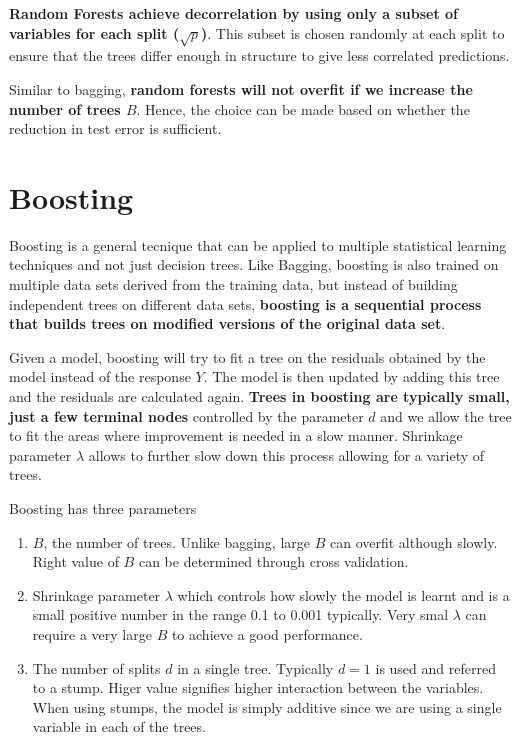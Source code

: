 \documentclass[../statistical_learning_notes.tex]{subfiles}
\begin{document}
    \textbf{Random Forests achieve decorrelation by using only a subset of variables for each split ($\sqrt{p}$)}. This subset is chosen randomly at each split to ensure that the trees differ enough in structure to give less correlated predictions.\newline

    Similar to bagging, \textbf{random forests will not overfit if we increase the number of trees $B$}. Hence, the choice can be made based on whether the reduction in test error is sufficient.
    

    \section{Boosting}
    Boosting is a general tecnique that can be applied to multiple statistical learning techniques and not just decision trees. Like Bagging, boosting is also trained on multiple data sets derived from the training data, but instead of building independent trees on different data sets, \textbf{boosting is a sequential process that builds trees on modified versions of the original data set}.\newline

    Given a model, boosting will try to fit a tree on the residuals obtained by the model instead of the response $Y$. The model is then updated by adding this tree and the residuals are calculated again. \textbf{Trees in boosting are typically small, just a few terminal nodes} controlled by the parameter $d$ and we allow the tree to fit the areas where improvement is needed in a slow manner. Shrinkage parameter $\lambda$ allows to further slow down this process allowing for a variety of trees.\newline

    Boosting has three parameters
    \begin{enumerate}
         \item $B$, the number of trees. Unlike bagging, large $B$ can overfit although slowly. Right value of $B$ can be determined through cross validation.
         \item Shrinkage parameter $\lambda$ which controls how slowly the model is learnt and is a small positive number in the range 0.1 to 0.001 typically. Very smal $\lambda$ can require a very large $B$ to achieve a good performance.
         \item The number of splits $d$ in a single tree. Typically $d=1$ is used and referred to a stump. Higer value signifies higher interaction between the variables. When using stumps, the model is simply additive since we are using a single variable in each of the trees.
     \end{enumerate}
\end{document}
